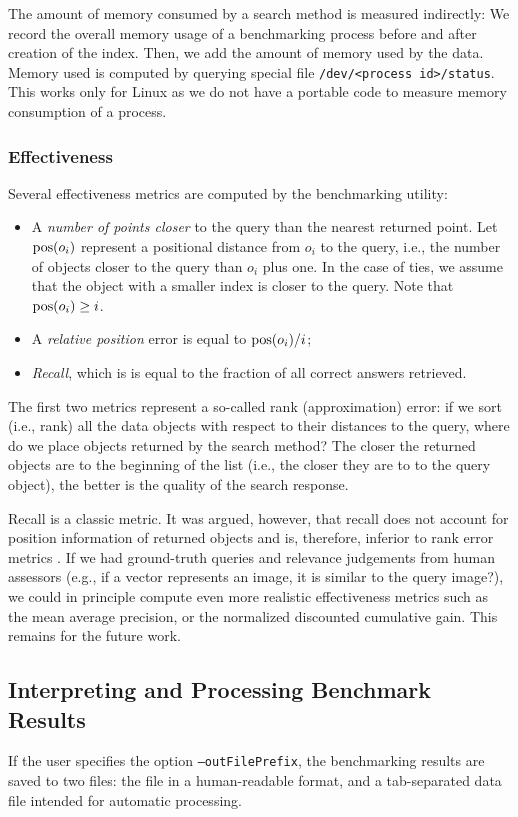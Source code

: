 \documentclass[runningheads,a4paper]{llncs}
\newcommand{\ttt}[1]{\texttt{#1}}
\newcommand{\pos}{\mbox{\rm pos}}
\begin{document}
{The amount of memory consumed by a search method is measured indirectly: 
We record the overall memory usage of a benchmarking process before and after creation of the index. Then, we add the amount of memory used by the data.
Memory used is computed by querying special file \ttt{/dev/<process id>/status}. 
This works only for Linux as we do not have a portable code to measure memory consumption of a process.

\subsubsection{Effectiveness}
\label{SectionEffect}

Several effectiveness metrics are computed by the benchmarking utility:
\begin{itemize}
\item  A \emph{number of points closer} to the query than the nearest returned point.
Let $\pos(o_i)$ represent a positional distance from $o_i$ to the query, 
i.e., the number of objects closer to the query than $o_i$ plus one.
In the case of ties, we assume that the object with a smaller index is closer to the query.
Note that $\pos(o_i) \ge i$.
\item A \emph{relative position} error is equal to $\pos(o_i)/i$;
\item \emph{Recall},  which is is equal to the fraction of all correct answers retrieved.
\end{itemize}
The first two metrics represent a so-called rank (approximation) error:
if we sort (i.e., rank) all the data objects with respect to their distances to the query,
where do we place objects returned by the search method?
The closer the returned objects are to the beginning of the list (i.e., 
the closer they are to to the query object), the better is the quality of the search response.

Recall is a classic metric. 
It was argued, however, 
that recall does not account for position information of returned objects
and is, therefore, inferior to rank error metrics \cite{Amato_et_al:2003,Cayton:2008}.
If we had ground-truth queries and relevance judgements from human assessors (e.g.,
if a vector represents an image, it is similar to the query image?),
we could in principle compute even more realistic effectiveness metrics 
such as the mean average precision,
or the normalized discounted cumulative gain.
This remains for the future work.

\subsection{Interpreting and Processing Benchmark Results}
If the user specifies the option \ttt{--outFilePrefix},
the benchmarking results are saved to two files:
the file in a human-readable format,
and a tab-separated data file intended for automatic processing.

}
\end{document}

